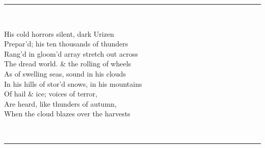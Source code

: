 \documentclass[reqno,a4paper,12pt]{amsart}%
\numberwithin{equation}{section}
\theoremstyle{definition}
\begin{document}
 

\begin{center}
	\par\noindent\rule{200pt}{0.1pt}
\end{center}

\

\begin{center}		
His cold horrors silent, dark Urizen \\
Prepar'd; his ten thousands of thunders \\
Rang'd in gloom'd array stretch out across \\
The dread world. \& the rolling of wheels \\
As of swelling seas, sound in his clouds \\
In his hills of stor'd snows, in his mountains \\
Of hail \& ice; voices of terror, \\
Are heard, like thunders of autumn, \\
When the cloud blazes over the harvests
\end{center}

\

\begin{center}
	\par\noindent\rule{200pt}{0.1pt}
\end{center}
\end{document}
